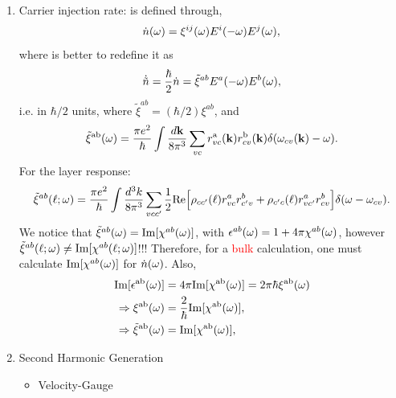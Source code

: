 \documentclass[12pt]{article}
\numberwithin{equation}{section}
\begin{document}
\begin{enumerate}
\item Carrier injection rate: is defined through,
\begin{align}\label{cir}
\dot n(\omega)=\xi^{ij}(\omega)E^i(-\omega)E^j(\omega)  
,
\end{align} 
where is better to redefine it as 
\begin{align}\label{cir}
\dot{\tilde n}=
\frac{\hbar}{2}\dot 
n=\tilde\xi^{ab}E^a(-\omega)E^b(\omega)
,
\end{align}
i.e. in $\hbar/2$ units, where
$\tilde\xi^{ab}=(\hbar/2)
\xi^{ab}$, and
\begin{equation}\label{chifp}
\tilde\xi^{\mathrm{a}\mathrm{b}}(\omega)=\frac{\pi e^2}{\hbar}
\int \frac{d\mathbf{k}}{8\pi^3}
\sum_{vc}
r^{\mathrm{a}}_{vc}(\mathbf{k})r^{\mathrm{b}}_{cv}(\mathbf{k})\delta(\omega_{cv}(\mathbf{k})-\omega)
.
\end{equation} 
For the layer response:
\begin{equation*}\label{xizn}
\tilde\xi^{ab}(\ell;\omega)
=
\frac{\pi e^2}{\hbar}
\int\frac{d^3k}{8\pi^3}
\sum_{vcc'}
\frac{1}{2}\mathrm{Re}\Big[
\rho_{cc'}(\ell)    
r^a_{vc} 
r^b_{c'v}
+
\rho_{c'c}(\ell) 
r^a_{vc'} 
r^b_{cv}
\Big]
\delta(\omega-\omega_{cv})
.
\end{equation*}
We notice that $\tilde\xi^{ab}(\omega)=\mathrm{Im}[\chi^{ab}(\omega)]$, with
$\epsilon^{ab}(\omega)=1+4\pi\chi^{ab}(\omega)$, however 
$\tilde\xi^{ab}(\ell;\omega)\neq\mathrm{Im}[\chi^{ab}(\ell;\omega)]$!!!
Therefore, for a \textcolor{red}{bulk} calculation, one must calculate
$\mathrm{Im}[\chi^{ab}(\omega)]$ for $\dot n(\omega)$.
Also,
\begin{align}\label{nn.11}
\mathrm{Im}[\epsilon^{\mathrm{a}\mathrm{b}}(\omega)]
&=
4\pi\mathrm{Im}[\chi^{\mathrm{a}\mathrm{b}}(\omega)]
=
2\pi\hbar\xi^{\mathrm{a}\mathrm{b}}(\omega)
\nonumber\\
\Rightarrow 
\xi^{\mathrm{a}\mathrm{b}}(\omega) 
&=
\frac{2}{\hbar}\mathrm{Im}[\chi^{\mathrm{a}\mathrm{b}}(\omega)],
\nonumber\\
\Rightarrow 
\tilde\xi^{\mathrm{a}\mathrm{b}}(\omega) 
&=
\mathrm{Im}[\chi^{\mathrm{a}\mathrm{b}}(\omega)],
\end{align}


\item Second Harmonic Generation
\begin{itemize}
\item Velocity-Gauge 


\end{itemize}
\end{enumerate}
\end{document}
